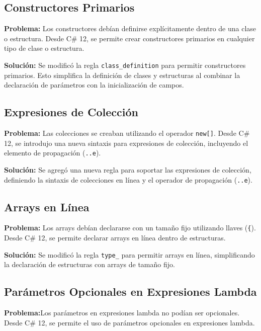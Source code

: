 \subsection*{Constructores Primarios}

\textbf{Problema:} Los constructores deb\'ian definirse expl\'icitamente dentro de una clase o estructura. Desde C\# 12, se permite crear constructores primarios en cualquier tipo de clase o estructura.

\textbf{Soluci\'on:} Se modific\'o la regla \texttt{class\_definition} para permitir constructores primarios. Esto simplifica la definici\'on de clases y estructuras al combinar la declaraci\'on de par\'ametros con la inicializaci\'on de campos.

\subsection*{Expresiones de Colecci\'on}

\textbf{Problema:} Las colecciones se creaban utilizando el operador \texttt{new[]}. Desde C\# 12, se introdujo una nueva sintaxis para expresiones de colecci\'on, incluyendo el elemento de propagaci\'on (\texttt{..e}).

\textbf{Soluci\'on:} Se agreg\'o una nueva regla para soportar las expresiones de colecci\'on, definiendo la sintaxis de colecciones en l\'inea y el operador de propagaci\'on (\texttt{..e}).

\subsection*{Arrays en L\'inea}

\textbf{Problema:} Los arrays deb\'ian declararse con un tama\~no fijo utilizando llaves (\texttt{\{}). Desde C\# 12, se permite declarar arrays en l\'inea dentro de estructuras.

\textbf{Soluci\'on:} Se modific\'o la regla \texttt{type\_} para permitir arrays en l\'inea, simplificando la declaraci\'on de estructuras con arrays de tama\~no fijo.

\subsection*{Par\'ametros Opcionales en Expresiones Lambda}

\textbf{Problema:}Los par\'ametros en expresiones lambda no pod\'ian ser opcionales. Desde C\# 12, se permite el uso de par\'ametros opcionales en expresiones lambda.

